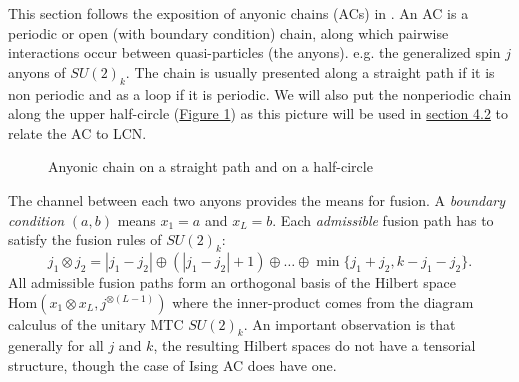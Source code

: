 \documentclass[twoside,11pt,titlepage]{amsart}
\renewcommand{\=}[1]{\stackrel{#1}{=}} %
\theoremstyle{definition}
\theoremstyle{remark}
\begin{document}
This section follows the exposition of anyonic chains (ACs) in \cite{gils2013anyonic,feiguin2007interacting}. An AC is a periodic or open (with boundary condition) chain, along which pairwise interactions occur between quasi-particles (the anyons). e.g. the generalized spin $j$ anyons of $SU(2)_k$. The chain is usually presented along a straight path if it is non periodic and as a loop if it is periodic. We will also put the nonperiodic chain along the upper half-circle (\hyperref[fig1]{Figure 1}) as this picture will be used in \hyperref[4.2]{section 4.2} to relate the AC to LCN.
\begin{figure}\label{fig1}
\centering
{}
\hspace{0.5cm}
\caption{Anyonic chain on a straight path and on a half-circle}
\end{figure}
The channel between each two anyons provides the means for fusion. A \textit{boundary condition} $(a,b)$ means $x_1=a$ and $x_L=b$. Each \textit{admissible} fusion path has to satisfy the fusion rules of $SU(2)_k$:
$$j_1 \otimes j_2=|j_1-j_2| \oplus (|j_1-j_2|+1) \oplus \ldots \oplus \min\{j_1+j_2,k-j_1-j_2\}.$$
All admissible fusion paths form an orthogonal basis of the Hilbert space $\text{Hom}(x_1\otimes x_L,j^{\otimes (L-1)})$ where the inner-product comes from the diagram calculus of the unitary MTC $SU(2)_k$. An important observation is that generally for all $j$ and $k$, the resulting Hilbert spaces do not have a tensorial structure, though the case of Ising AC does have one.
\end{document}
